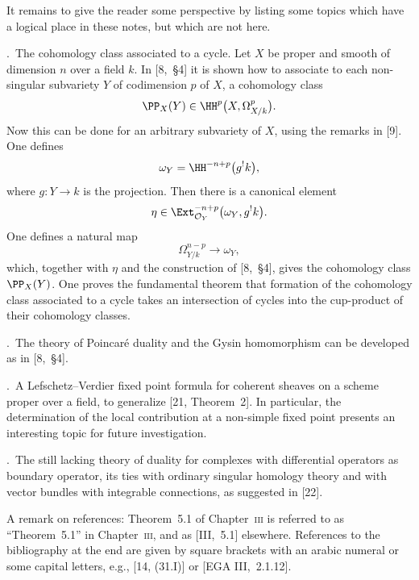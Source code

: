 It remains to give the reader some perspective by listing some topics which have a logical place in these notes, but which are not here.

\medskip
{}.\ The cohomology class associated to a cycle.
Let $X$ be proper and smooth of dimension $n$ over a field $k$. In [8,~\S4] it is shown how to associate to each non-singular subvariety $Y$ of codimension $p$ of $X$, a cohomology class
\[
\PP_{X}(Y) \in \HH^{p}\bigl(X, \Omega_{X/k}^{p}\bigr).
\]
Now this can be done for an arbitrary subvariety of $X$, using the remarks in [9]. One defines
\[
\omega_{Y} = \HH^{-n+p}\bigl(g^{!}k\bigr),
\]
where $g\colon Y\to k$ is the projection. Then there is a canonical element
\[
\eta \in \Ext_{\mathcal{O}_{Y}}^{-n+p}\bigl(\omega_{Y}, g^{!}k\bigr).
\]
One defines a natural map
\[
\Omega_{Y/k}^{n-p} \to \omega_{Y},
\]
which, together with $\eta$ and the construction of [8,~\S4], gives the cohomology class $\PP_{X}(Y)$. One proves the fundamental theorem that formation of the cohomology class associated to a cycle takes an intersection of cycles into the cup-product of their cohomology classes.

\medskip
{}.\ The theory of Poincaré duality and the Gysin homomorphism can be developed as in [8,~\S4].

\medskip
{}.\ A Lefschetz–Verdier fixed point formula for coherent sheaves on a scheme proper over a field, to generalize [21, Theorem~2]. In particular, the determination of the local contribution at a non-simple fixed point presents an interesting topic for future investigation.

\medskip
{}.\ The still lacking theory of duality for complexes with differential operators as boundary operator, its ties with ordinary singular homology theory and with vector bundles with integrable connections, as suggested in [22].

\bigskip

A remark on references: Theorem~5.1 of Chapter~\textsc{iii} is referred to as ``Theorem~5.1'' in Chapter~\textsc{iii}, and as \textup{[III,~5.1]} elsewhere. References to the bibliography at the end are given by square brackets with an arabic numeral or some capital letters, e.g., \textup{[14, (31.I)]} or \textup{[EGA III,~2.1.12]}.
